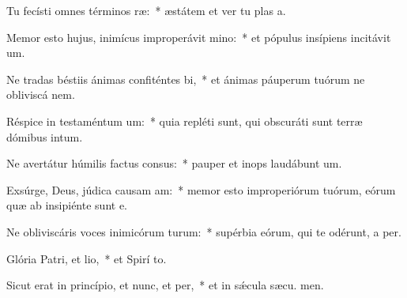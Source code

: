 \item Tu fecísti omnes términos ræ:~* æstátem et ver tu plas a.
\item Memor esto hujus, inimícus improperávit mino:~* et pópulus insípiens incitávit  um.
\item Ne tradas béstiis ánimas confiténtes bi,~* et ánimas páuperum tuórum ne obliviscá  nem.
\item Réspice in testaméntum um:~* quia repléti sunt, qui obscuráti sunt terræ dómibus intum.
\item Ne avertátur húmilis factus consus:~* pauper et inops laudábunt  um.
\item Exsúrge, Deus, júdica causam am:~* memor esto improperiórum tuórum, eórum quæ ab insipiénte sunt  e.
\item Ne obliviscáris voces inimicórum turum:~* supérbia eórum, qui te odérunt, a per.
\item Glória Patri, et lio,~* et Spirí to.
\item Sicut erat in princípio, et nunc, et per,~* et in sǽcula sæcu. men.
